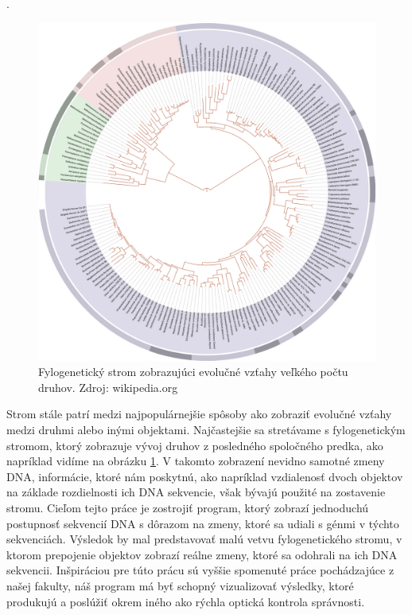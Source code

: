 \cite{Kovac2011,Hozza2014,Herencsar2014,Vinar2010}. 
\begin{figure}[t]
 \centering
\includegraphics[width=1\textwidth]{images/tol}
\caption{Fylogenetický strom zobrazujúci evolučné vzťahy veľkého počtu druhov. Zdroj: wikipedia.org}\label{obr:tol}
\end{figure}

Strom stále patrí medzi najpopulárnejšie spôsoby ako zobraziť evolučné vzťahy medzi druhmi alebo inými objektami.
Najčastejšie sa stretávame s fylogenetickým stromom, ktorý zobrazuje vývoj druhov z posledného spoločného predka, ako napríklad vidíme na obrázku \ref{obr:tol}.
V takomto zobrazení nevidno samotné zmeny DNA, informácie, ktoré nám poskytnú, 
ako napríklad vzdialenosť dvoch objektov na základe rozdielnosti ich DNA sekvencie, však bývajú použité na zostavenie stromu.
Cieľom tejto práce je zostrojiť program, ktorý zobrazí jednoduchú postupnosť sekvencií DNA s dôrazom na zmeny, ktoré sa udiali s génmi v týchto sekvenciách.
Výsledok by mal predstavovať malú vetvu fylogenetického stromu, v ktorom prepojenie objektov zobrazí reálne zmeny, ktoré sa odohrali na ich DNA sekvencii.
Inšpiráciou pre túto prácu sú vyššie spomenuté práce pochádzajúce z našej fakulty,
náš program má byť schopný vizualizovať výsledky, ktoré produkujú a poslúžiť okrem iného ako rýchla optická kontrola správnosti.

